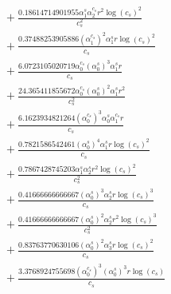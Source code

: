 \documentclass[10pt]{article}
\begin{document}
\begin{align*}
&{}  + \frac{0.18614714901955 \alpha_{1}^s \alpha_{2}^{c_s} r^{2} \log{\left(c_{s} \right)}^{2}}{c_{s}^{2}} \\
&{}  + \frac{0.37488253905886 \left(\alpha_{1}^{c_s}\right)^{2} \alpha_{1}^s r \log{\left(c_{s} \right)}^{2}}{c_{s}} \\
&{}  + \frac{6.0723105020719 \alpha_{0}^{c_s} \left(\alpha_{0}^s\right)^{3} \alpha_{1}^s r}{c_{s}} \\
&{}  + \frac{24.365411855672 \alpha_{0}^{c_s} \left(\alpha_{0}^s\right)^{2} \alpha_{1}^s r^{2}}{c_{s}^{2}} \\
&{}  + \frac{6.1623934821264 \left(\alpha_{0}^{c_s}\right)^{3} \alpha_{0}^s \alpha_{1}^{c_s} r}{c_{s}} \\
&{}  + \frac{0.7821586542461 \left(\alpha_{0}^s\right)^{4} \alpha_{1}^s r \log{\left(c_{s} \right)}^{2}}{c_{s}} \\
&{}  + \frac{0.7867428745203 \alpha_{1}^s \alpha_{2}^s r^{2} \log{\left(c_{s} \right)}^{2}}{c_{s}^{2}} \\
&{}  + \frac{0.41666666666667 \left(\alpha_{0}^s\right)^{3} \alpha_{2}^s r \log{\left(c_{s} \right)}^{3}}{c_{s}} \\
&{}  + \frac{0.41666666666667 \left(\alpha_{0}^s\right)^{2} \alpha_{2}^s r^{2} \log{\left(c_{s} \right)}^{3}}{c_{s}^{2}} \\
&{}  + \frac{0.83763770630106 \left(\alpha_{0}^s\right)^{2} \alpha_{3}^s r \log{\left(c_{s} \right)}^{2}}{c_{s}} \\
&{}  + \frac{3.3768924755698 \left(\alpha_{0}^{c_s}\right)^{3} \left(\alpha_{0}^s\right)^{3} r \log{\left(c_{s} \right)}}{c_{s}}
\end{align*}
\end{document}
